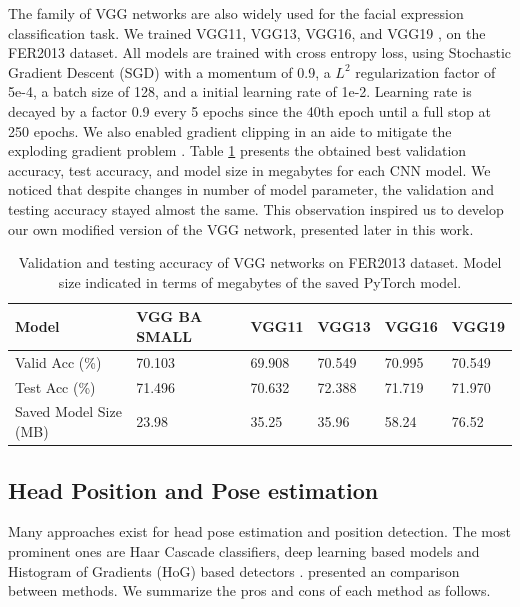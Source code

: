 \documentclass{article}
\begin{document}
The family of VGG networks are also widely used for the facial expression classification task. We trained VGG11, VGG13, VGG16, and VGG19 \cite{simonyan_zisserman_2014}, on the FER2013 dataset. All models are trained with cross entropy loss, using Stochastic Gradient Descent (SGD) with a momentum of 0.9, a $L^2$ regularization factor of 5e-4, a batch size of 128, and a initial learning rate of 1e-2. Learning rate is decayed by a factor 0.9 every 5 epochs since the 40th epoch until a full stop at 250 epochs. We also enabled gradient clipping in an aide to mitigate the exploding gradient problem \cite{Pascanu2012UnderstandingTE}. Table \ref{tab:vgg comparisons} presents the obtained best validation accuracy, test accuracy, and model size in megabytes for each CNN model. We noticed that despite changes in number of model parameter, the validation and testing accuracy stayed almost the same. This observation inspired us to develop our own modified version of the VGG network, presented later in this work. 

\begin{table}[]
    \centering
    \begin{tabular}{@{}l|lllll@{}}
        \toprule
        Model                 & VGG BA SMALL & VGG11  & VGG13  & VGG16  & VGG19  \\ \midrule
        Valid Acc (\%)        & 70.103         & 69.908 & 70.549 & 70.995 & 70.549 \\
        Test Acc (\%)         & 71.496         & 70.632 & 72.388 & 71.719 & 71.970 \\
        Saved Model Size (MB) & 23.98          & 35.25  & 35.96  & 58.24  & 76.52  \\ 
        \bottomrule
    \end{tabular}
    \vspace{1em}
    \caption{Validation and testing accuracy of VGG networks on FER2013 dataset. Model size indicated in terms of megabytes of the saved PyTorch model. }
    \label{tab:vgg comparisons}
\end{table}

\subsection{Head Position and Pose estimation}
Many approaches exist for head pose estimation and position detection. The most prominent ones are Haar Cascade classifiers, deep learning based models and Histogram of Gradients (HoG) based detectors \cite{haar_cascade, dalal_triggs_2005, murphy2009}. \cite{gupta_2018} presented an comparison between methods. We summarize the pros and cons of each method as follows. 
\end{document}

